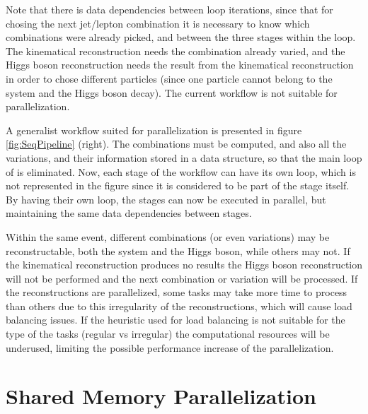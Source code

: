 Note that there is data dependencies between loop iterations, since that for chosing the next jet/lepton combination it is necessary to know which combinations were already picked, and between the three stages within the loop. The kinematical reconstruction needs the combination already varied, and the Higgs boson reconstruction needs the result from the kinematical reconstruction in order to chose different particles (since one particle cannot belong to the \ttbar system and the Higgs boson decay). The current workflow is not suitable for parallelization.

A generalist workflow suited for parallelization is presented in figure \ref{fig:SeqPipeline} (right). The combinations must be computed, and also all the variations, and their information stored in a data structure, so that the main loop of \ttDilepKinFit is eliminated. Now, each stage of the workflow can have its own loop, which is not represented in the figure since it is considered to be part of the stage itself. By having their own loop, the stages can now be executed in parallel, but maintaining the same data dependencies between stages.

Within the same event, different combinations (or even variations) may be reconstructable, both the \ttbar system and the Higgs boson, while others may not. If the kinematical reconstruction produces no results the Higgs boson reconstruction will not be performed and the next combination or variation will be processed. If the reconstructions are parallelized, some tasks may take more time to process than others due to this irregularity of the reconstructions, which will cause load balancing issues. If the heuristic used for load balancing is not suitable for the type of the tasks (regular vs irregular) the computational resources will be underused, limiting the possible performance increase of the parallelization.

\section{Shared Memory Parallelization}
\label{Parallelization:SharedMem}

